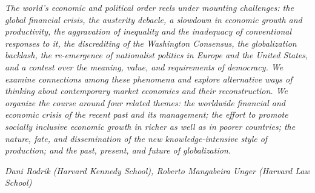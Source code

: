 \documentclass{article}
\begin{document}

\textit{The world’s economic and political order reels under mounting challenges: the global financial crisis, the austerity debacle, a slowdown in economic growth and productivity, the aggravation of inequality and the inadequacy of conventional responses to it, the discrediting of the Washington Consensus, the globalization backlash, the re-emergence of nationalist politics in Europe and the United States, and a contest over the meaning, value, and requirements of democracy. We examine connections among these phenomena and explore alternative ways of thinking about contemporary market economies and their reconstruction. We organize the course around four related themes: the worldwide financial and economic crisis of the recent past and its management; the effort to promote socially inclusive economic growth in richer as well as in poorer countries; the nature, fate, and dissemination of the new knowledge-intensive style of production; and the past, present, and future of globalization.}

\textit{Dani Rodrik (Harvard Kennedy School), Roberto Mangabeira Unger (Harvard Law School)}

\tableofcontents


\end{document}
